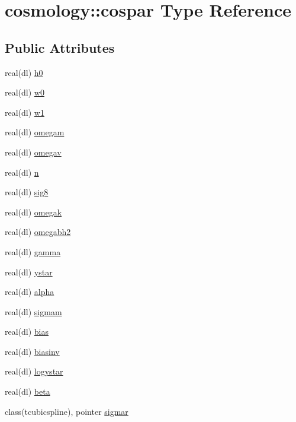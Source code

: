 \hypertarget{structcosmology_1_1cospar}{}\section{cosmology\+:\+:cospar Type Reference}
\label{structcosmology_1_1cospar}
\subsection*{Public Attributes}
\begin{DoxyCompactItemize}
\item 
real(dl) \mbox{\hyperlink{structcosmology_1_1cospar_ab975c42c904ef5bcb751a7e31a2cd61e}{h0}}
\item 
real(dl) \mbox{\hyperlink{structcosmology_1_1cospar_a2d89c36381ff2f70e695b2f8bddde3d7}{w0}}
\item 
real(dl) \mbox{\hyperlink{structcosmology_1_1cospar_a1b66e4499cb4977d1000f23ba647a95a}{w1}}
\item 
real(dl) \mbox{\hyperlink{structcosmology_1_1cospar_acc6c65a64d540075f8c594da90db6f4b}{omegam}}
\item 
real(dl) \mbox{\hyperlink{structcosmology_1_1cospar_aca133e94ed74e646fa0675f7e30a633e}{omegav}}
\item 
real(dl) \mbox{\hyperlink{structcosmology_1_1cospar_a8d5f92a553420eab704f03cbb9421362}{n}}
\item 
real(dl) \mbox{\hyperlink{structcosmology_1_1cospar_acc5280b2efd98d7701e790edc5baa973}{sig8}}
\item 
real(dl) \mbox{\hyperlink{structcosmology_1_1cospar_a0b84caae57561cf5a5d4edc3a4f43fba}{omegak}}
\item 
real(dl) \mbox{\hyperlink{structcosmology_1_1cospar_a49e77982391a51c1fcc56e94bd0c0f12}{omegabh2}}
\item 
real(dl) \mbox{\hyperlink{structcosmology_1_1cospar_aa55ab39dbe6b05cddaafea574595a8bd}{gamma}}
\item 
real(dl) \mbox{\hyperlink{structcosmology_1_1cospar_a28f0a6ad5d2ad23a4d09eab5bea6b040}{ystar}}
\item 
real(dl) \mbox{\hyperlink{structcosmology_1_1cospar_a6b5dd785ce04c638ad70cb1eb817340c}{alpha}}
\item 
real(dl) \mbox{\hyperlink{structcosmology_1_1cospar_a3ef97ce42f30bb71c442ceb7153a1f33}{sigmam}}
\item 
real(dl) \mbox{\hyperlink{structcosmology_1_1cospar_ab55ce01d93d9e326eee172ea3d44973c}{bias}}
\item 
real(dl) \mbox{\hyperlink{structcosmology_1_1cospar_a3102b45dfce13ccb03dd459c45d6b439}{biasinv}}
\item 
real(dl) \mbox{\hyperlink{structcosmology_1_1cospar_a18264263e5518d492cf69dc449cca11d}{logystar}}
\item 
real(dl) \mbox{\hyperlink{structcosmology_1_1cospar_a9c7bb5c071172fbd97ce5c13efc3390d}{beta}}
\item 
class(tcubicspline), pointer \mbox{\hyperlink{structcosmology_1_1cospar_a7425df85ecf8cfa6a11e9a69e123fcf8}{sigmar}}
\end{DoxyCompactItemize}


